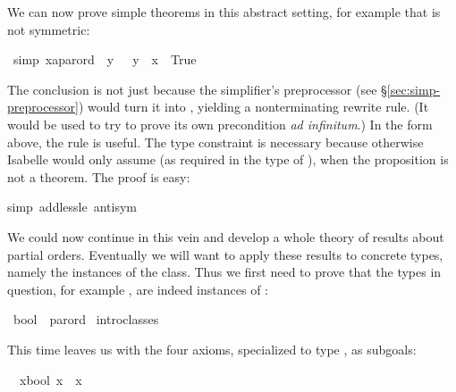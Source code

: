 \begin{isabellebody}
\begin{isamarkuptext}
We can now prove simple theorems in this abstract setting, for example
that \isa{{\isacharless}{\isacharless}} is not symmetric:%
\end{isamarkuptext}%
\isamarkuptrue%
\ {\isacharbrackleft}simp{\isacharbrackright}{\isacharcolon}\ {\isachardoublequote}{\isacharparenleft}x{\isacharcolon}{\isacharcolon}{\isacharprime}a{\isacharcolon}{\isacharcolon}parord{\isacharparenright}\ {\isacharless}{\isacharless}\ y\ {\isasymLongrightarrow}\ {\isacharparenleft}{\isasymnot}\ y\ {\isacharless}{\isacharless}\ x{\isacharparenright}\ {\isacharequal}\ True{\isachardoublequote}\isamarkupfalse%
%
\begin{isamarkuptxt}%
\noindent
The conclusion is not just  because the 
simplifier's preprocessor (see \S\ref{sec:simp-preprocessor})
would turn it into , yielding
a nonterminating rewrite rule.  
(It would be used to try to prove its own precondition \emph{ad
    infinitum}.)
In the form above, the rule is useful.
The type constraint is necessary because otherwise Isabelle would only assume
 (as required in the type of \isa{{\isacharless}{\isacharless}}), 
when the proposition is not a theorem.  The proof is easy:%
\end{isamarkuptxt}%
\isamarkuptrue%
simp\ add{\isacharcolon}less{\isacharunderscore}le\ antisym{\isacharparenright}\isamarkupfalse%
%
\begin{isamarkuptext}%
We could now continue in this vein and develop a whole theory of
results about partial orders. Eventually we will want to apply these results
to concrete types, namely the instances of the class. Thus we first need to
prove that the types in question, for example , are indeed
instances of :%
\end{isamarkuptext}%
\isamarkuptrue%
\ bool\ {\isacharcolon}{\isacharcolon}\ parord\isanewline
\isamarkupfalse%
\ intro{\isacharunderscore}classes\isamarkupfalse%
%
\begin{isamarkuptxt}%
\noindent
This time  leaves us with the four axioms,
specialized to type , as subgoals:
\begin{isabelle}%
\ {}{\isachardot}\ {\isasymAnd}x{\isasymColon}bool{\isachardot}\ x\ {\isacharless}{\isacharless}{\isacharequal}\ x\isanewline

\end{isabelle}
\end{isamarkuptxt}
\end{isabellebody}
